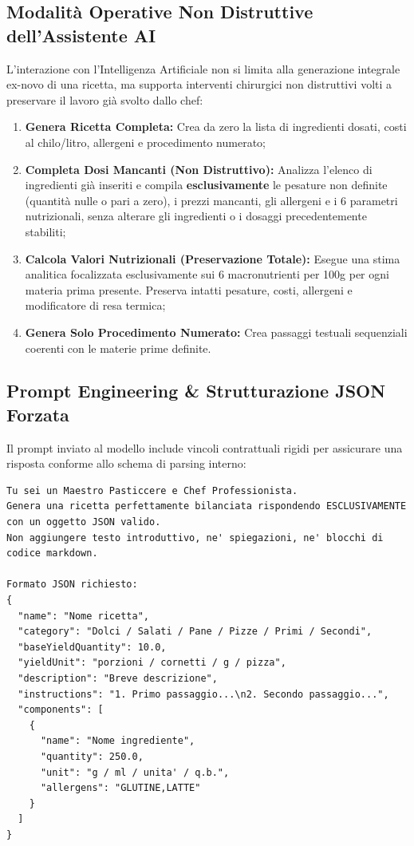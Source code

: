 \documentclass[11pt,a4paper,titlepage]{article}
\begin{document}
\subsection{Modalit\`a Operative Non Distruttive dell'Assistente AI}
L'interazione con l'Intelligenza Artificiale non si limita alla generazione integrale ex-novo di una ricetta, ma supporta interventi chirurgici non distruttivi volti a preservare il lavoro gi\`a svolto dallo chef:
\begin{enumerate}[leftmargin=*]
    \item \textbf{Genera Ricetta Completa:} Crea da zero la lista di ingredienti dosati, costi al chilo/litro, allergeni e procedimento numerato;
    \item \textbf{Completa Dosi Mancanti (Non Distruttivo):} Analizza l'elenco di ingredienti gi\`a inseriti e compila \textbf{esclusivamente} le pesature non definite (quantit\`a nulle o pari a zero), i prezzi mancanti, gli allergeni e i 6 parametri nutrizionali, senza alterare gli ingredienti o i dosaggi precedentemente stabiliti;
    \item \textbf{Calcola Valori Nutrizionali (Preservazione Totale):} Esegue una stima analitica focalizzata esclusivamente sui 6 macronutrienti per 100g per ogni materia prima presente. Preserva intatti pesature, costi, allergeni e modificatore di resa termica;
    \item \textbf{Genera Solo Procedimento Numerato:} Crea passaggi testuali sequenziali coerenti con le materie prime definite.
\end{enumerate}

\subsection{Prompt Engineering \& Strutturazione JSON Forzata}
Il prompt inviato al modello include vincoli contrattuali rigidi per assicurare una risposta conforme allo schema di parsing interno:
\begin{lstlisting}[caption={Prompt di sistema con schema contrattuale JSON}]
Tu sei un Maestro Pasticcere e Chef Professionista.
Genera una ricetta perfettamente bilanciata rispondendo ESCLUSIVAMENTE con un oggetto JSON valido.
Non aggiungere testo introduttivo, ne' spiegazioni, ne' blocchi di codice markdown.

Formato JSON richiesto:
{
  "name": "Nome ricetta",
  "category": "Dolci / Salati / Pane / Pizze / Primi / Secondi",
  "baseYieldQuantity": 10.0,
  "yieldUnit": "porzioni / cornetti / g / pizza",
  "description": "Breve descrizione",
  "instructions": "1. Primo passaggio...\n2. Secondo passaggio...",
  "components": [
    {
      "name": "Nome ingrediente",
      "quantity": 250.0,
      "unit": "g / ml / unita' / q.b.",
      "allergens": "GLUTINE,LATTE"
    }
  ]
}
\end{lstlisting}
\end{document}
